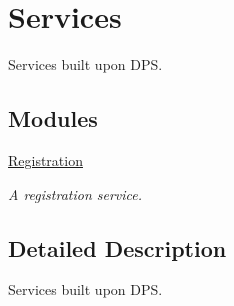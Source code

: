 \hypertarget{group__services}{}\section{Services}
\label{group__services}


Services built upon D\+PS.  


\subsection*{Modules}
\begin{DoxyCompactItemize}
\item 
\hyperlink{group__registration}{Registration}
\begin{DoxyCompactList}\small\item\em A registration service. \end{DoxyCompactList}\end{DoxyCompactItemize}


\subsection{Detailed Description}
Services built upon D\+PS. 

